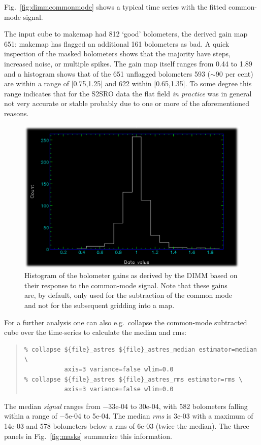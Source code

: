 \documentclass[twoside,11pt]{article}
\newcommand{\about}{$\sim$}
\renewcommand{\_}{\texttt{\symbol{95}}}
\newenvironment{myquote}{\begin{quote}\begin{small}}{\end{small}\end{quote}}
\begin{document}
Fig.~\ref{fig:dimmcommonmode} shows a typical time series with the
fitted common-mode signal.

The input cube to makemap had 812 `good' bolometers, the derived gain
map 651: makemap has flagged an additional 161 bolometers as bad.  A
quick inspection of the masked bolometers shows that the majority have
steps, increased noise, or multiple spikes.  The gain map itself
ranges from 0.44 to 1.89 and a histogram shows that of the 651
unflagged bolometers 593 (\about90 per cent) are within a range of
[0.75,1.25] and 622 within [0.65,1.35]. To some degree this range
indicates that for the S2SRO data the flat field \textsl{in practice}
was in general not very accurate or stable probably due to one or more
of the aforementioned reasons.

\begin{figure}[ht]
\begin{center}
\includegraphics[width=0.45\linewidth]{sc19_gain_histogram}
\caption{Histogram of the bolometer gains as derived by the DIMM
based on their response to the common-mode signal. Note that these
gains are, by default, only used for the subtraction of the common
mode and not for the subsequent gridding into a map.}
\label{fig:gainhistogram}
\end{center}
\end{figure}

For a further analysis one can also e.g.\ collapse the common-mode
subtracted cube over the time-series to calculate the median and rms:

\begin{myquote}
\begin{verbatim}
% collapse ${file}_astres ${file}_astres_median estimator=median \
           axis=3 variance=false wlim=0.0
% collapse ${file}_astres ${file}_astres_rms estimator=rms \
           axis=3 variance=false wlim=0.0
\end{verbatim}
\end{myquote}

The median \textsl{signal} ranges from $-$33e-04 to 30e-04, with 582
bolometers falling within a range of $-$5e-04 to 5e-04. The median
\textsl{rms} is 3e-03 with a maximum of 14e-03 and 578 bolometers
below a rms of 6e-03 (twice the median).  The three panels in
Fig.~\ref{fig:masks} summarize this information.
\end{document}
